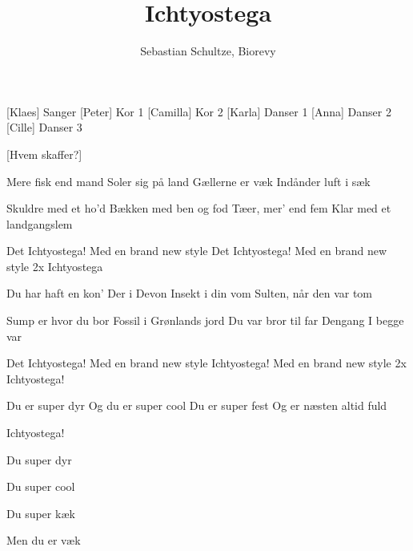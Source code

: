 \documentclass[a4paper,12pt]{article}
\title{Ichtyostega}
\author{Sebastian Schultze, Biorevy}
\begin{document}
\maketitle

\begin{roles}
	[Klaes] Sanger
	[Peter] Kor 1
	[Camilla] Kor 2
	[Karla] Danser 1
	[Anna] Danser 2
	[Cille] Danser 3
\end{roles}


\begin{props}
	[Hvem skaffer?]
\end{props}

\begin{song}

Mere fisk end mand
Soler sig på land
Gællerne er væk
Indånder luft i sæk

Skuldre med et ho'd
Bækken med ben og fod
Tæer, mer' end fem
Klar med et landgangslem

Det Ichtyostega!
Med en brand new style
Det Ichtyostega!
Med en brand new style
2x Ichtyostega

Du har haft en kon'
Der i Devon
Insekt i din vom
Sulten, når den var tom

Sump er hvor du bor
Fossil i Grønlands jord
Du var bror til far
Dengang I begge var

Det Ichtyostega!
Med en brand new style
Ichtyostega!
Med en brand new style
2x Ichtyostega!

Du er super dyr
Og du er super cool
Du er super fest
Og er næsten altid fuld

Ichtyostega!

Du super dyr

Du super cool

Du super kæk

Men du er væk


\end{song}
\end{document}
